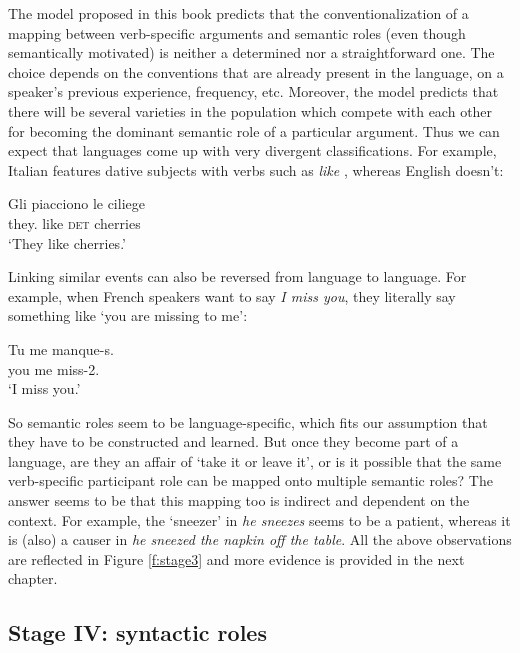 The model proposed in this book predicts that the conventionalization of a mapping between verb-specific arguments and semantic roles (even though semantically motivated) is neither a determined nor a straightforward one. The choice depends on the conventions that are already present in the language, on a speaker's previous experience, frequency, etc. Moreover, the model predicts that there will be several varieties in the population which compete with each other for becoming the dominant semantic role of a particular argument. Thus we can expect that languages come up with very divergent classifications. For example, Italian features dative subjects with verbs such as {\em like} \citep[27]{palmer94grammatical}, whereas English doesn't:

\ea
\gll Gli piacciono le ciliege \\
they.{\dat} like \textsc{det} cherries \\
\glt `They like cherries.'  \\
\z


Linking similar events can also be reversed from language to language. For example, when French speakers want to say {\em I miss you}, they literally say something like `you are missing to me':

\ea
\gll Tu me manque-s. \\
you me miss-2{\sg}.{\prs} \\
\glt `I miss you.' \\
\z


So semantic roles seem to be language-specific, which fits our assumption that they have to be constructed and learned. But once they become part of a language, are they an affair of `take it or leave it', or is it possible that the same verb-specific participant role can be mapped onto multiple semantic roles? The answer seems to be that this mapping too is indirect and dependent on the context. For example, the `sneezer' in {\em he sneezes} seems to be a patient, whereas it is (also) a causer in {\em he sneezed the napkin off the table}. All the above observations are reflected in Figure \ref{f:stage3} and more evidence is provided in the next chapter.

\subsection{Stage IV: syntactic roles}
\label{s:stage4}

